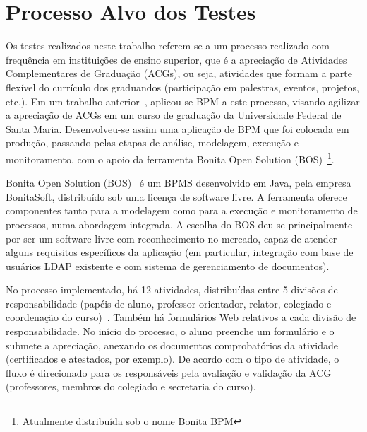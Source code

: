 \documentclass[12pt]{article}
\begin{document}
\section{Processo Alvo dos Testes}
Os testes realizados neste trabalho referem-se a um processo realizado com frequência em instituições de ensino superior, que é a apreciação de Atividades Complementares de Graduação (ACGs), ou seja, atividades que formam a parte flexível do currículo dos graduandos (participação em palestras, eventos, projetos, etc.). Em um trabalho anterior~\cite{sbsi2013}, aplicou-se BPM a este processo, visando agilizar a apreciação de ACGs em um curso de graduação da Universidade Federal de Santa Maria. Desenvolveu-se assim uma aplicação de BPM que foi colocada em produção, passando pelas etapas de análise, modelagem, execução e monitoramento, com o apoio da ferramenta Bonita Open Solution (BOS)~\footnote{Atualmente distribuída sob o nome Bonita BPM}.


Bonita Open Solution (BOS)~\cite{BONITASOFT} é um BPMS desenvolvido em Java, pela empresa BonitaSoft, distribuído sob uma licença de software livre. A ferramenta oferece componentes tanto para a modelagem como para a execução e monitoramento de processos, numa abordagem integrada. 
A escolha do BOS deu-se principalmente por ser um software livre com reconhecimento no mercado, capaz de atender alguns requisitos específicos da aplicação (em particular, integração com base de usuários LDAP existente e com sistema de gerenciamento de documentos).


No processo implementado, há 12 atividades, distribuídas entre 5 divisões de responsabilidade (papéis de aluno, professor orientador, relator, colegiado e coordenação do curso)~\cite{sbsi2013}. Também há formulários Web relativos a cada divisão de responsabilidade. No início do processo, o aluno preenche um formulário e o submete a apreciação, anexando os documentos comprobatórios da atividade (certificados e atestados, por exemplo). De acordo com o tipo de atividade, o fluxo é direcionado para os responsáveis pela avaliação e validação da ACG (professores, membros do colegiado e secretaria do curso).
\end{document}
